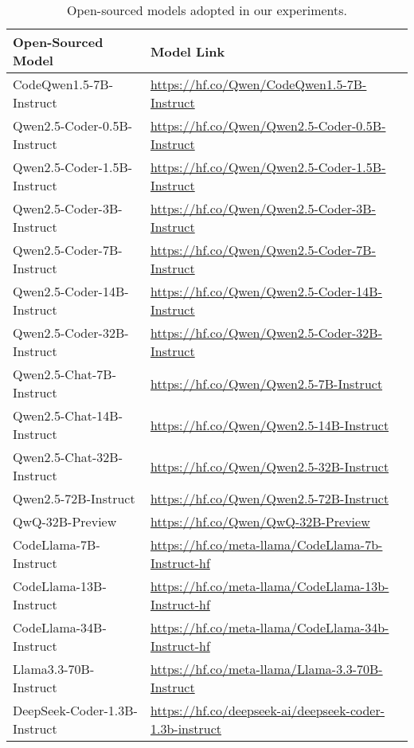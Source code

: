 \documentclass[11pt, a4paper, logo, copyright, nonumbering, amsart]{map}
\begin{document}
\begin{CJK*}{UTF8}{gbsn}
\begin{table*}[h!]
    \small \centering
    \caption{Open-sourced models adopted in our experiments.} \label{table:open_source_model}
    \begin{adjustbox}{width=0.8\textwidth}
    \begin{tabular}{l|l}
        \toprule
        \textbf{Open-Sourced Model} & \textbf{Model Link} \\
        \midrule
        CodeQwen1.5-7B-Instruct & \url{https://hf.co/Qwen/CodeQwen1.5-7B-Instruct} \\
        Qwen2.5-Coder-0.5B-Instruct & \url{https://hf.co/Qwen/Qwen2.5-Coder-0.5B-Instruct} \\
        Qwen2.5-Coder-1.5B-Instruct & \url{https://hf.co/Qwen/Qwen2.5-Coder-1.5B-Instruct} \\
        Qwen2.5-Coder-3B-Instruct & \url{https://hf.co/Qwen/Qwen2.5-Coder-3B-Instruct} \\
        Qwen2.5-Coder-7B-Instruct & \url{https://hf.co/Qwen/Qwen2.5-Coder-7B-Instruct} \\
        Qwen2.5-Coder-14B-Instruct & \url{https://hf.co/Qwen/Qwen2.5-Coder-14B-Instruct} \\
        Qwen2.5-Coder-32B-Instruct & \url{https://hf.co/Qwen/Qwen2.5-Coder-32B-Instruct} \\
        Qwen2.5-Chat-7B-Instruct & \url{https://hf.co/Qwen/Qwen2.5-7B-Instruct} \\
        Qwen2.5-Chat-14B-Instruct & \url{https://hf.co/Qwen/Qwen2.5-14B-Instruct} \\
        Qwen2.5-Chat-32B-Instruct & \url{https://hf.co/Qwen/Qwen2.5-32B-Instruct} \\
        Qwen2.5-72B-Instruct & \url{https://hf.co/Qwen/Qwen2.5-72B-Instruct} \\
        QwQ-32B-Preview & \url{https://hf.co/Qwen/QwQ-32B-Preview} \\
        \midrule
        CodeLlama-7B-Instruct & \url{https://hf.co/meta-llama/CodeLlama-7b-Instruct-hf} \\
        CodeLlama-13B-Instruct & \url{https://hf.co/meta-llama/CodeLlama-13b-Instruct-hf} \\
        CodeLlama-34B-Instruct & \url{https://hf.co/meta-llama/CodeLlama-34b-Instruct-hf} \\
        Llama3.3-70B-Instruct & \url{https://hf.co/meta-llama/Llama-3.3-70B-Instruct} \\
        \midrule
        DeepSeek-Coder-1.3B-Instruct & \url{https://hf.co/deepseek-ai/deepseek-coder-1.3b-instruct} \\

\end{tabular}
\end{adjustbox}
\end{table*}
\end{CJK*}
\end{document}
